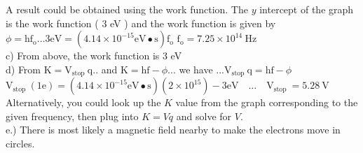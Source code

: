\begin{enumerate}
A result could be obtained using the work function. The $y$ intercept of the graph is the work function ( 3 eV ) and the work function is given by $\phi=\mathrm{hf}_{\mathrm{o}} \ldots 3 \mathrm{eV}=\left(4.14 \times 10^{-15} \mathrm{eV} \bullet \mathrm{s}\right) \mathrm{f}_{\mathrm{o}}$ $\mathrm{f}_{\mathrm{o}}=7.25 \times 10^{14} \mathrm{~Hz}$\\
c) From above, the work function is 3 eV\\
d) From $\mathrm{K}=\mathrm{V}_{\text {stop }} \mathrm{q} .$. and $\mathrm{K}=\mathrm{hf}-\phi . .$. we have $. . . \mathrm{V}_{\text {stop }} \mathrm{q}=\mathrm{hf}-\phi$\\
$\mathrm{V}_{\text {stop }}(1 \mathrm{e})=\left(4.14 \times 10^{-15} \mathrm{eV} \bullet \mathrm{s}\right)\left(2 \times 10^{15}\right)-3 \mathrm{eV} \quad \ldots \quad \mathrm{V}_{\text {stop }}=5.28 \mathrm{~V}$\\
Alternatively, you could look up the $K$ value from the graph corresponding to the given frequency, then plug into $K=V q$ and solve for $V$.\\
e.) There is most likely a magnetic field nearby to make the electrons move in circles.


\end{enumerate}
